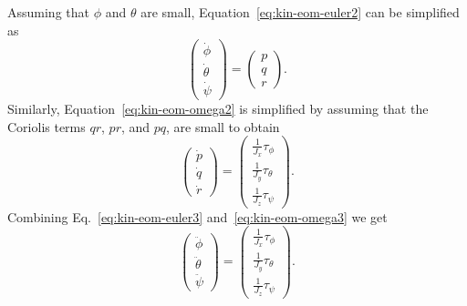 {Assuming that $\phi$ and $\theta$ are small,
Equation~\eqref{eq:kin-eom-euler2} can be simplified as
\begin{equation}\label{eq:kin-eom-euler3}
\begin{pmatrix} \dot{\phi} \\ \dot{\theta} \\ \dot{\psi} \end{pmatrix}
=  \begin{pmatrix} p \\ q \\ r \end{pmatrix}.
\end{equation}
Similarly, Equation~\eqref{eq:kin-eom-omega2} is simplified by
assuming that the Coriolis terms $qr$, $pr$, and $pq$, are small to
obtain
\begin{equation}\label{eq:kin-eom-omega3}
\begin{pmatrix} \dot{p} \\ \dot{q} \\ \dot{r} \end{pmatrix}
=   \begin{pmatrix}
    \frac{1}{J_x} \tau_{\phi} \\
    \frac{1}{J_y} \tau_{\theta} \\
    \frac{1}{J_z} \tau_{\psi}
    \end{pmatrix}.
\end{equation}
Combining Eq.~\eqref{eq:kin-eom-euler3}
and~\eqref{eq:kin-eom-omega3} we get
\begin{equation}\label{eq:kin-euler-ddot}
\begin{pmatrix} \ddot{\phi} \\ \ddot{\theta} \\ \ddot{\psi} \end{pmatrix}
=  \begin{pmatrix}
    \frac{1}{J_x} \tau_{\phi} \\
    \frac{1}{J_y} \tau_{\theta} \\
    \frac{1}{J_z} \tau_{\psi}
    \end{pmatrix}.
\end{equation}

}
